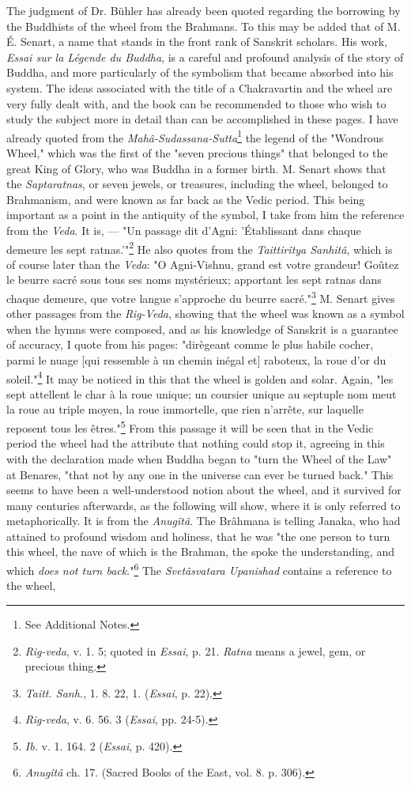 \documentclass[a4paper, 11pt, oneside, polutonikogreek, english]{article}
\begin{document}
The judgment of Dr. Bühler has already been quoted regarding the borrowing by the Buddhists of the wheel from the Brahmans. To this may be added that of M. É. Senart, a name that stands in the front rank of Sanskrit scholars. His work, \emph{Essai sur la Légende du Buddha}, is a careful and profound analysis of the story of Buddha, and more particularly of the symbolism that became absorbed into his system. The ideas associated with the title of a Chakravartin and the wheel are very fully dealt with, and the book can be recommended to those who wish to study the subject more in detail than can be accomplished in these pages. I have already quoted from the \emph{Mahâ-Sudassana-Sutta}\footnote{See Additional Notes.} the legend of the "Wondrous Wheel," which was the first of the "seven precious things" that belonged to the great King of Glory, who was Buddha in a former birth. M. Senart shows that the \emph{Saptaratnas}, or seven jewels, or treasures, including the wheel, belonged to Brahmanism, and were known as far back as the Vedic period. This being important as a point in the antiquity of the symbol, I take from him the reference from the \emph{Veda}. It is, --- "Un passage dit d'Agni: 'Établissant dans chaque demeure les sept ratnas.'"\footnote{\emph{Rig-veda}, v. 1. 5; quoted in \emph{Essai}, p. 21. \emph{Ratna} means a jewel, gem, or precious thing.} He also quotes from the \emph{Taittirîtya Sanhitâ}, which is of course later than the \emph{Veda}: "O Agni-Vishnu, grand est votre grandeur! Goûtez le beurre sacré sous tous ses noms mystérieux; apportant les sept ratnas dans chaque demeure, que votre langue s'approche du beurre sacré."\footnote{\emph{Taitt. Sanh.}, 1. 8. 22, 1. (\emph{Essai}, p. 22).} M. Senart gives other passages from the \emph{Rig-Veda}, showing that the wheel was known as a symbol when the hymns were composed, and as his knowledge of Sanskrit is a guarantee of accuracy, I quote from his pages: "dirègeant comme le plus habile cocher, parmi le nuage [qui ressemble à un chemin inégal et] raboteux, la roue d'or du soleil."\footnote{\emph{Rig-veda}, v. 6. 56. 3 (\emph{Essai}, pp. 24-5).} It may be noticed in this that the wheel is golden and solar. Again, "les sept attellent le char à la roue unique; un coursier unique au septuple nom meut la roue au triple moyen, la roue immortelle, que rien n'arrête, sur laquelle reposent tous les êtres."\footnote{\emph{Ib.} v. 1. 164. 2 (\emph{Essai}, p. 420).} From this passage it will be seen that in the Vedic period the wheel had the attribute that nothing could stop it, agreeing in this with the declaration made when Buddha began to "turn the Wheel of the Law" at Benares, "that not by any one in the universe can ever be turned back." This seems to have been a well-understood notion about the wheel, and it survived for many centuries afterwards, as the following will show, where it is only referred to metaphorically. It is from the \emph{Anugîtâ}. The Brâhmana is telling Janaka, who had attained to profound wisdom and holiness, that he was "the one person to turn this wheel, the nave of which is the Brahman, the spoke the understanding, and which \emph{does not turn back}."\footnote{\emph{Anugîtâ} ch. 17. (Sacred Books of the East, vol. 8. p. 306).} The \emph{Svetâsvatara Upanishad} contains a reference to the wheel, 
\end{document}
